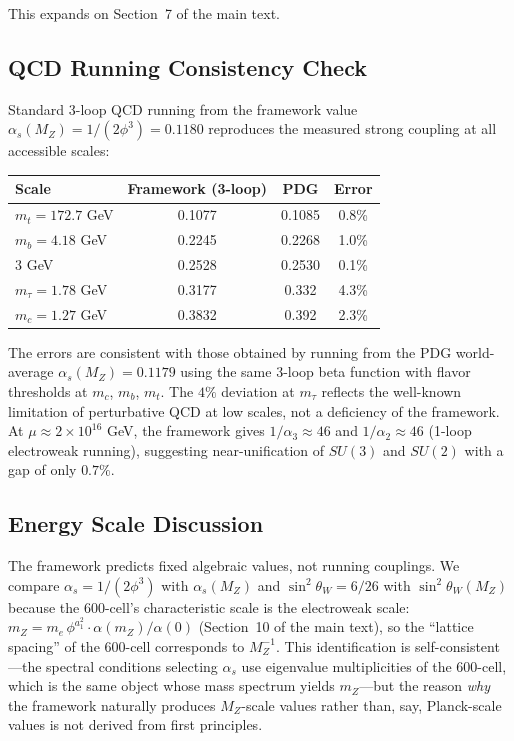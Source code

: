\documentclass[12pt,a4paper]{article}
\theoremstyle{definition}
\begin{document}
This expands on Section~7 of the main text.

\subsection{QCD Running Consistency Check}

Standard 3-loop QCD running from the framework value $\alpha_s(M_Z) = 1/(2\phi^3) = 0.1180$ reproduces the measured strong coupling at all accessible scales:

\begin{center}
\begin{tabular}{lccc}
\toprule
\textbf{Scale} & \textbf{Framework (3-loop)} & \textbf{PDG} & \textbf{Error} \\
\midrule
$m_t = 172.7$ GeV & 0.1077 & 0.1085 & 0.8\% \\
$m_b = 4.18$ GeV  & 0.2245 & 0.2268 & 1.0\% \\
$3$ GeV           & 0.2528 & 0.2530 & 0.1\% \\
$m_\tau = 1.78$ GeV & 0.3177 & 0.332 & 4.3\% \\
$m_c = 1.27$ GeV  & 0.3832 & 0.392  & 2.3\% \\
\bottomrule
\end{tabular}
\end{center}

\noindent The errors are consistent with those obtained by running from the PDG world-average $\alpha_s(M_Z) = 0.1179$ using the same 3-loop beta function with flavor thresholds at $m_c$, $m_b$, $m_t$. The $4\%$ deviation at $m_\tau$ reflects the well-known limitation of perturbative QCD at low scales, not a deficiency of the framework. At $\mu \approx 2 \times 10^{16}$ GeV, the framework gives $1/\alpha_3 \approx 46$ and $1/\alpha_2 \approx 46$ (1-loop electroweak running), suggesting near-unification of $SU(3)$ and $SU(2)$ with a gap of only $0.7\%$.

\subsection{Energy Scale Discussion}

The framework predicts fixed algebraic values, not running couplings. We compare $\alpha_s = 1/(2\phi^3)$ with $\alpha_s(M_Z)$ and $\sin^2\theta_W = 6/26$ with $\sin^2\theta_W(M_Z)$ because the 600-cell's characteristic scale is the electroweak scale: $m_Z = m_e\,\phi^{a_1^2} \cdot \alpha(m_Z)/\alpha(0)$ (Section~10 of the main text), so the ``lattice spacing'' of the 600-cell corresponds to $M_Z^{-1}$. This identification is self-consistent---the spectral conditions selecting $\alpha_s$ use eigenvalue multiplicities of the 600-cell, which is the same object whose mass spectrum yields $m_Z$---but the reason \emph{why} the framework naturally produces $M_Z$-scale values rather than, say, Planck-scale values is not derived from first principles.
\end{document}
